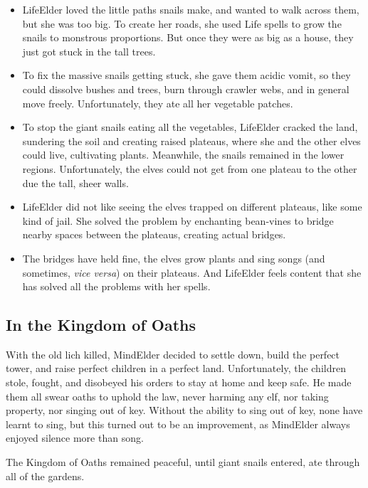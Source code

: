 \begin{itemize}
  \item
  \gls{LifeElder} loved the little paths snails make, and wanted to walk across them, but she was too big.
  To create her roads, she used Life spells to grow the snails to monstrous proportions.
  But once they were as big as a house, they just got stuck in the tall trees.
  \item
  To fix the massive snails getting stuck, she gave them acidic vomit, so they could dissolve bushes and trees, burn through \gls{crawler} webs, and in general move freely.
  Unfortunately, they ate all her vegetable patches.
  \item
  To stop the giant snails eating all the vegetables, \gls{LifeElder} cracked the land, sundering the soil and creating raised plateaus, where she and the other elves could live, cultivating plants.
  Meanwhile, the snails remained in the lower regions.
  Unfortunately, the elves could not get from one plateau to the other due the tall, sheer walls.
  \item
  \gls{LifeElder} did not like seeing the elves trapped on different plateaus, like some kind of jail.
  She solved the problem by enchanting bean-vines to bridge nearby spaces between the plateaus, creating actual bridges.
  \item
  The bridges have held fine, the elves grow plants and sing songs (and sometimes, \textit{vice versa}) on their plateaus.
  And \gls{LifeElder} feels content that she has solved all the problems with her spells.
\end{itemize}

\subsection{In the Kingdom of Oaths}

With the old lich killed, \gls{MindElder} decided to settle down, build the perfect tower, and raise perfect children in a perfect land.
Unfortunately, the children stole, fought, and disobeyed his orders to stay at home and keep safe.
He made them all swear oaths to uphold the law, never harming any elf, nor taking property, nor singing out of key.
Without the ability to sing out of key, none have learnt to sing, but this turned out to be an improvement, as \gls{MindElder} always enjoyed silence more than song.

The Kingdom of Oaths remained peaceful, until giant snails entered, ate through all of the gardens.

